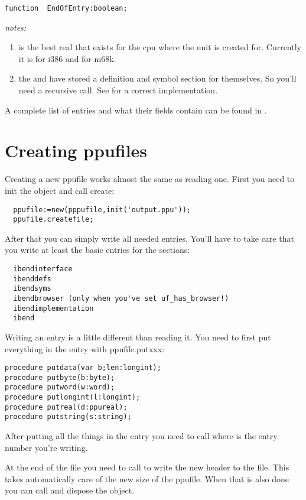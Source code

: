 \begin{verbatim}
function  EndOfEntry:boolean;
\end{verbatim}
{\em notes:}
\begin{enumerate}
\item {} is the best real that exists for the cpu where the
unit is created for. Currently it is  for i386 and
 for m68k.
\item the  and  have stored a definition
and symbol section for themselves. So you'll need a recursive call. See
 for a correct implementation.
\end{enumerate}

A complete list of entries and what their fields contain can be found
in .

\section{Creating ppufiles}
Creating a new ppufile works almost the same as reading one.
First you need to init the object and call create:
\begin{verbatim}
  ppufile:=new(pppufile,init('output.ppu'));
  ppufile.createfile;
\end{verbatim}

After that you can simply write all needed entries. You'll have to take
care that you write at least the basic entries for the sections:
\begin{verbatim}
  ibendinterface
  ibenddefs
  ibendsyms
  ibendbrowser (only when you've set uf_has_browser!)
  ibendimplementation
  ibend
\end{verbatim}

Writing an entry is a little different than reading it. You need to first
put everything in the entry with ppufile.putxxx:
\begin{verbatim}
procedure putdata(var b;len:longint);
procedure putbyte(b:byte);
procedure putword(w:word);
procedure putlongint(l:longint);
procedure putreal(d:ppureal);
procedure putstring(s:string);
\end{verbatim}

After putting all the things in the entry you need to call
 where  is the entry number
you're writing.

At the end of the file you need to call  to write the
new header to the file. This takes automatically care of the new size of the
ppufile. When that is also done you can call  and dispose the
object.

